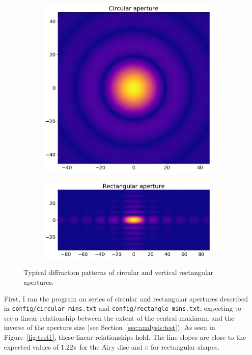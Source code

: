 \documentclass[11pt]{article}
\begin{document}
\begin{figure}
    \centering
    \begin{subfigure}{0.5\textwidth}
        \centering
        \includegraphics[width=\textwidth]{pictures/def/out0}
        \caption{}\label{fig:typ:round}
    \end{subfigure}%
    \begin{subfigure}{0.5\textwidth}
        \centering
        \includegraphics[width=\textwidth]{pictures/def/out1}
        \caption{}\label{fig:typ:rect}
    \end{subfigure}
    \caption{Typical diffraction patterns of circular and vertical rectangular apertures.}\label{fig:typ}
\end{figure}

First, I ran the program on series of circular and rectangular apertures described in \texttt{config/circular\_mins.txt} and \texttt{config/rectangle\_mins.txt}, expecting to see a linear relationship between the extent of the central maximum and the inverse of the aperture size (see Section~\ref{sec:analysis:test}). As seen in Figure~\ref{fig:test1}, these linear relationships hold. The line slopes are close to the expected values of $1.22\pi$ for the Airy disc and $\pi$ for rectangular shapes.
\end{document}
